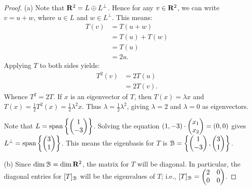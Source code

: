 \documentclass[10pt,twoside,openany]{memoir}
\begin{document}
    {\color{blue} \begin{proof}
        (a) Note that $\mathbf{R}^2 = L \oplus L^\perp$. Hence for any $v \in \mathbf{R}^2$, we can write $v = u + w$, where $u \in L$ and $w \in L^\perp$. This means:
            \begin{equation*}
            \begin{split}
                T(v)
                & = T(u + w) \\
                & = T(u) + T(w) \\
                & = T(u) \\
                & = 2u.
            \end{split}
            \end{equation*}
        Applying $T$ to both sides yields:
            \begin{equation*}
            \begin{split}
                T^2(v)
                & = 2T(u) \\
                & = 2T(v).
            \end{split}
            \end{equation*}
        Whence $T^2 = 2T$. If $x$ is an eigenvector of $T$, then $T(x) = \lambda x$ and $T(x) = \frac{1}{2}T^2(x) = \frac{1}{2}\lambda^2 x$. Thus $\lambda = \frac{1}{2}\lambda^2$, giving $\lambda = 2$ and $\lambda = 0$ as eigenvectors.

        Note that $L = \operatorname{span}\left\{\left( \begin{matrix} 1 \\ -3 \end{matrix} \right) \right\}$. Solving the equation $(1,-3) \cdot \left( \begin{matrix} x_1 \\ x_2 \end{matrix} \right) = (0,0)$ gives $L ^\perp = \operatorname{span} \left\{ \left( \begin{matrix} 3 \\ 1 \end{matrix} \right) \right\}$. This means the eigenbasis for $T$ is $\mathcal{B} = \left\{ \left( \begin{matrix} 1 \\ -3 \end{matrix} \right), \left( \begin{matrix} 3 \\ 1 \end{matrix} \right) \right\}$.

        (b) Since $\dim \mathcal{B} = \dim \mathbf{R}^2$, the matrix for $T$ will be diagonal. In particular, the diagonal entries for $[T]_{\mathcal{B}}$ will be the eigenvalues of $T$; i.e., $[T]_{\mathcal{B}} = \left( \begin{matrix} 2 & 0 \\ 0 & 0 \end{matrix} \right)$.


\end{proof}}
\end{document}
